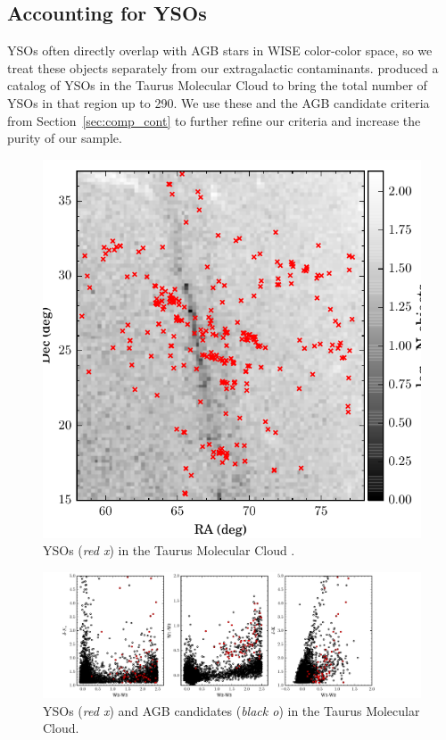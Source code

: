 \subsection{Accounting for YSOs}\label{sec:kill_ysos}
YSOs often directly overlap with AGB stars in WISE color-color space, so we treat these objects separately from our  extragalactic contaminants. \cite{2011ApJS..196....4R} produced a catalog of YSOs in the Taurus Molecular Cloud to bring the total number of YSOs in that region up to 290. We use these and the AGB candidate criteria from Section~\ref{sec:comp_cont} to further refine our criteria and increase the purity of our sample.

\begin{figure}[h]
\includegraphics[width=6in]{figs/taurus_field_YSOs.pdf}
\caption{YSOs (\emph{red x}) in the Taurus Molecular Cloud \citep{2011ApJS..196....4R}.\label{fig:yso_field}}
\end{figure}
\begin{figure}[h]
\includegraphics[width=6in]{figs/ysos_taurus_color.pdf}
\caption{YSOs (\emph{red x}) and AGB candidates (\emph{black o}) in the Taurus Molecular Cloud.\label{fig:ysos_agbs_taurus}}
\end{figure}
